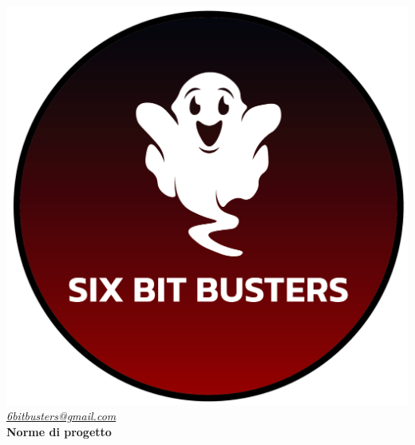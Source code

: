 \thispagestyle{empty}
\renewcommand{\arraystretch}{1.3}


\begin{titlepage}
	\begin{center}
		
	\includegraphics[scale = 0.6]{template/images/logo-circle.png}
	\\[0.8cm]
	\href{mailto:6bitbusters@gmail.com}		      	
	{\large{\textit{6bitbusters@gmail.com} } }\\[0.8cm]
	
	\Huge \textbf{Norme di progetto} \\[0.5cm]


\end{center}
\end{titlepage}

